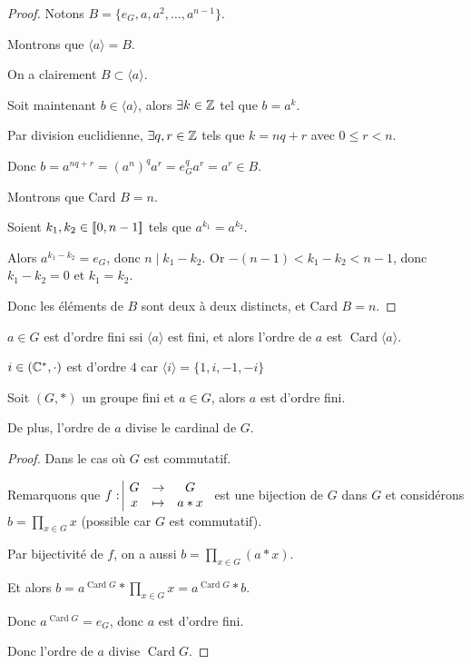 
\begin{proof}
    Notons $B = \{e_G, a, a^2, \ldots, a^{n-1}\}$.

    Montrons que $\langle a \rangle = B$. 
    
    On a clairement $B \subset \langle a \rangle$.

    Soit maintenant $b \in \langle a \rangle$, alors $\exists k \in \mathbb{Z}$ tel que $b = a^k$.

    Par division euclidienne, $\exists q, r \in \mathbb{Z}$ tels que $k = nq + r$ avec $0 \leq r < n$.

    Donc $b = a^{nq + r} = (a^n)^q a^r = e_G^q a^r = a^r \in B$.

    \avspace Montrons que Card $B = n$.

    Soient $k_1, k_2 \in [\![0, n-1]\!]$ tels que $a^{k_1} = a^{k_2}$.

    Alors $a^{k_1 - k_2} = e_G$, donc $n \mid k_1 - k_2$.
    Or $-(n-1) < k_1 - k_2 < n-1$, donc $k_1 - k_2 = 0$ et $k_1 = k_2$.

    Donc les éléments de $B$ sont deux à deux distincts, et Card $B = n$.

\end{proof}

\begin{corollaire}{}{}
    $a \in G$ est d'ordre fini ssi $\langle a \rangle$ est fini, et alors l'ordre de 
    $a$ est $\operatorname{Card} \langle a \rangle$.
\end{corollaire}

\begin{exemple}
    $i \in (\mathbb{C}^*, \cdot)$ est d'ordre $4$ car
    $\langle i \rangle = \{1, i, -1, -i\}$
\end{exemple}

\begin{theoreme}{}{}
    Soit $(G, \ast)$ un groupe fini et $a \in G$, 
    alors $a$ est d'ordre fini. 

    De plus, l'ordre de $a$ divise le cardinal de $G$.
    
\end{theoreme}


\begin{proof}
    Dans le cas où $G$ est commutatif. 

    Remarquons que $f: \space \begin{array}{|ccc} \displaystyle G & \to & \displaystyle G \\ \displaystyle x & \mapsto & \displaystyle a \ast x \end{array}$ est une bijection de $G$ dans $G$
    et considérons $\displaystyle b = \prod_{x \in G} x$ (possible car $G$ est commutatif).

    Par bijectivité de $f$, on a aussi $\displaystyle b = \prod_{x \in G} (a \ast x)$.

    Et alors $\displaystyle b = a^{\operatorname{Card} G} \ast \prod_{x \in G} x = a^{\operatorname{Card} G} \ast b$.

    Donc $a^{\operatorname{Card} G} = e_G$, donc $a$ est d'ordre fini.

    Donc l'ordre de $a$ divise $\operatorname{Card} G$.
\end{proof}

